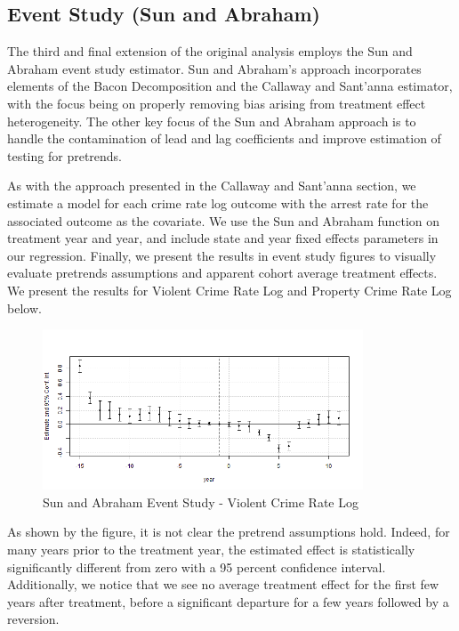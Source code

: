 \documentclass{article}
\begin{document}
\subsection{Event Study (Sun and Abraham)}

The third and final extension of the original analysis employs the Sun and Abraham event study estimator. Sun and Abraham's approach incorporates elements of the Bacon Decomposition and the Callaway and Sant'anna estimator, with the focus being on properly removing bias arising from treatment effect heterogeneity. The other key focus of the Sun and Abraham approach is to handle the contamination of lead and lag coefficients and improve estimation of testing for pretrends.

As with the approach presented in the Callaway and Sant'anna section, we estimate a model for each crime rate log outcome with the arrest rate for the associated outcome as the covariate. We use the Sun and Abraham function on treatment year and year, and include state and year fixed effects parameters in our regression. Finally, we present the results in event study figures to visually evaluate pretrends assumptions and apparent cohort average treatment effects. We present the results for Violent Crime Rate Log and Property Crime Rate Log below.

\begin{figure}[H]
	\begin{center}
		\includegraphics[width=0.85\textwidth]{violent}
	\end{center}
	\caption{Sun and Abraham Event Study - Violent Crime Rate Log}
	\label{fig:violent_graph}
\end{figure}

As shown by the figure, it is not clear the pretrend assumptions hold. Indeed, for many years prior to the treatment year, the estimated effect is statistically significantly different from zero with a 95 percent confidence interval. Additionally, we notice that we see no average treatment effect for the first few years after treatment, before a significant departure for a few years followed by a reversion.
\end{document}
